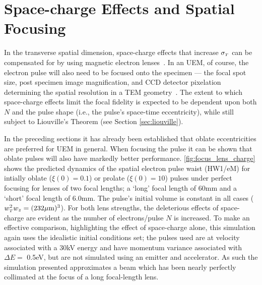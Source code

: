 
\section{Space-charge Effects and Spatial Focusing} \label{sec:mag_lens_charge}

In the transverse spatial dimension, space-charge effects that increase $ \sigma_{ {\scriptscriptstyle T} } $ can be compensated for by using magnetic electron lenses~\cite{oudheusden_electron_2007,lagrange_nanosecond_2008}.
In an UEM, of course, the electron pulse will also need to be focused onto the specimen --- the focal spot size, post specimen image magnification, and CCD detector pixelation determining the spatial resolution in a TEM geometry~\cite{berger_dc_2009}.
The extent to which space-charge effects limit the focal fidelity is expected to be dependent upon both $N$ and the pulse shape (i.e., the pulse's space-time eccentricity), while still subject to Liouville's Theorem (see Section \ref{sec:liouville}).



In the preceding sections it has already been established that oblate eccentricities are preferred for UEM in general.
When focusing the pulse it can be shown that oblate pulses will also have markedly better performance.
\ref{fig:focus_lens_charge} shows the predicted dynamics of the spatial electron pulse waist (HW1/eM) for intially oblate ($ \xi ( 0 ) = 0.1 $) or prolate ($ \xi ( 0 ) = 10 $) pulses under perfect focusing for lenses of two focal lengths; a `long' focal length of 60mm and a `short' focal length of 6.0mm.
The pulse's initial volume is constant in all cases ($w_{{\scriptscriptstyle T}}^2 w_{z} = (232 \mu\text{m})^3$).
For both lens strengths, the deleterious effects of space-charge are evident as the number of electrons/pulse $ N $ is increased.
To make an effective comparison, highlighting the effect of space-charge alone, this simulation again uses the idealistic initial conditions set; the pulses used are at velocity associated with a 30kV energy and have momentum variance associated with $\Delta E = $ 0.5eV, but are not simulated using an emitter and accelerator.
As such the simulation presented approximates a beam which has been nearly perfectly collimated at the focus of a long focal-length lens.

